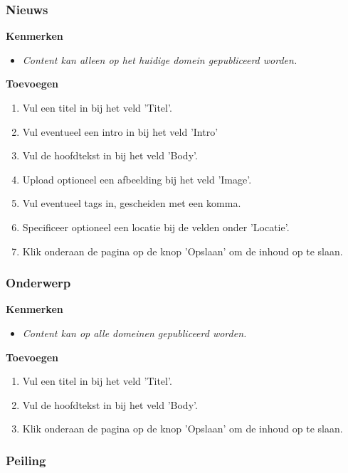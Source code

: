 \subsubsection{Nieuws}\label{nieuws}

\textbf{Kenmerken}

\begin{itemize}
\item \emph{Content kan alleen op het huidige domein gepubliceerd worden.}
\end{itemize}

\textbf{Toevoegen}

\begin{enumerate}
\item Vul een titel in bij het veld 'Titel'.
\item Vul eventueel een intro in bij het veld 'Intro'
\item Vul de hoofdtekst in bij het veld 'Body'.
\item Upload optioneel een afbeelding bij het veld 'Image'.
\item Vul eventueel tags in, gescheiden met een komma.
\item Specificeer optioneel een locatie bij de velden onder 'Locatie'.
\item Klik onderaan de pagina op de knop 'Opslaan' om de inhoud op te slaan.
\end{enumerate}

\subsubsection{Onderwerp}\label{onderwerp}

\textbf{Kenmerken}

\begin{itemize}
\item \emph{Content kan op alle domeinen gepubliceerd worden.}
\end{itemize}

\textbf{Toevoegen}

\begin{enumerate}
\item Vul een titel in bij het veld 'Titel'.
\item Vul de hoofdtekst in bij het veld 'Body'.
\item Klik onderaan de pagina op de knop 'Opslaan' om de inhoud op te slaan.
\end{enumerate}

\subsubsection{Peiling}\label{peiling}

